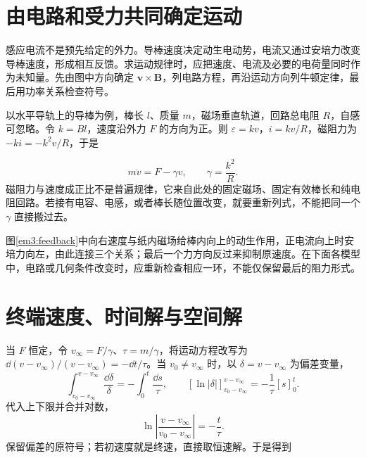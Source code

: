 \section{由电路和受力共同确定运动}

感应电流不是预先给定的外力。导棒速度决定动生电动势，电流又通过安培力改变导棒速度，形成相互反馈。求运动规律时，应把速度、电流及必要的电荷量同时作为未知量。先由图中方向确定 $\bm v\times\bm B$，列电路方程，再沿运动方向列牛顿定律，最后用功率关系检查符号。


以水平导轨上的导棒为例，棒长 $l$、质量 $m$，磁场垂直轨道，回路总电阻 $R$，自感可忽略。令 $k=Bl$，速度沿外力 $F$ 的方向为正。则 $\varepsilon=kv$，$i=kv/R$，磁阻力为 $-ki=-k^2v/R$，于是

\[m\dot v=F-\gamma v,\qquad\gamma=\frac{k^2}{R}.\]
磁阻力与速度成正比不是普遍规律，它来自此处的固定磁场、固定有效棒长和纯电阻回路。若接有电容、电感，或者棒长随位置改变，就要重新列式，不能把同一个 $\gamma$ 直接搬过去。


图\ref{em3:feedback}中向右速度与纸内磁场给棒内向上的动生作用，正电流向上时安培力向左，由此连接三个关系；最后一个力方向反过来抑制原速度。在下面各模型中，电路或几何条件改变时，应重新检查相应一环，不能仅保留最后的阻力形式。



\section{终端速度、时间解与空间解}

当 $F$ 恒定，令 $v_\infty=F/\gamma$、$\tau=m/\gamma$，将运动方程改写为 $\dd(v-v_\infty)/(v-v_\infty)=-\dd t/\tau$。当 $v_0\ne v_\infty$ 时，以 $\delta=v-v_\infty$ 为偏差变量，
\[
\int_{v_0-v_\infty}^{v-v_\infty}\frac{\dd\delta}{\delta}
 =-\int_0^t\frac{\dd s}{\tau},\qquad
 [\ln|\delta|]_{v_0-v_\infty}^{v-v_\infty}=-\frac1\tau[s]_0^t.
\]
代入上下限并合并对数，
\[
\ln\left|\frac{v-v_\infty}{v_0-v_\infty}\right|=-\frac t\tau.
\]
保留偏差的原符号；若初速度就是终速，直接取恒速解。于是得到

